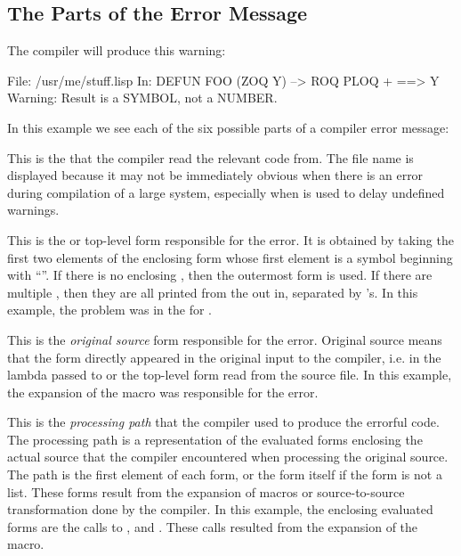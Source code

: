 \subsection{The Parts of the Error Message}

The compiler will produce this warning:

\begin{example}
File: /usr/me/stuff.lisp
In: DEFUN FOO
  (ZOQ Y)
--> ROQ PLOQ + 
==>
  Y
Warning: Result is a SYMBOL, not a NUMBER.
\end{example}

In this example we see each of the six possible parts of a compiler error
message:

\begin{Lentry} 
\item[\w{\code{File: /usr/me/stuff.lisp}}] This is the  that
  the compiler read the relevant code from.  The file name is
  displayed because it may not be immediately obvious when there is an
  error during compilation of a large system, especially when
   is used to delay undefined warnings.
  
\item[\w{\code{In: DEFUN FOO}}] This is the  or
  top-level form responsible for the error.  It is obtained by taking
  the first two elements of the enclosing form whose first element is
  a symbol beginning with ``''.  If there is no enclosing
  , then the outermost form is used.  If there are
  multiple , then they are all printed from the
  out in, separated by \code{$=>$}'s.  In this example, the problem
  was in the  for .
  
\item[\w{\code{(ZOQ Y)}}] This is the {\em original source} form
  responsible for the error.  Original source means that the form
  directly appeared in the original input to the compiler, i.e. in the
  lambda passed to  or the top-level form read from the
  source file.  In this example, the expansion of the  macro
  was responsible for the error.
  
\item[\w{\code{--$>$ ROQ PLOQ +}} ] This is the {\em processing path}
  that the compiler used to produce the errorful code.  The processing
  path is a representation of the evaluated forms enclosing the actual
  source that the compiler encountered when processing the original
  source.  The path is the first element of each form, or the form
  itself if the form is not a list.  These forms result from the
  expansion of macros or source-to-source transformation done by the
  compiler.  In this example, the enclosing evaluated forms are the
  calls to ,  and \code{+}.  These calls resulted
  from the expansion of the  macro.
  

\end{Lentry}
